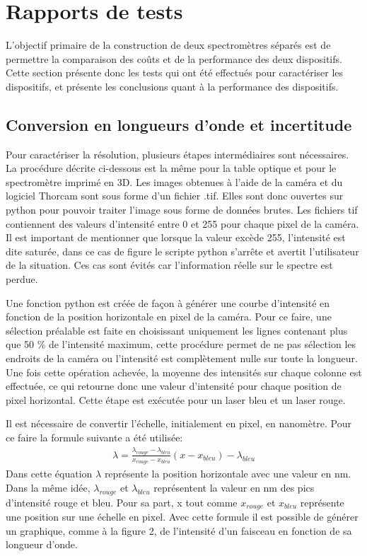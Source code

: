 \documentclass[11pt,letterpaper]{article}
\begin{document}
\section{Rapports de tests}

L'objectif primaire de la construction de deux spectromètres séparés est de permettre la 
comparaison des coûts et de la performance des deux dispositifs. Cette section présente
donc les tests qui ont été effectués pour caractériser les dispositifs, et présente les 
conclusions quant à la performance des dispositifs.

\subsection{Conversion en longueurs d'onde et incertitude}

Pour caractériser la résolution, plusieurs étapes intermédiaires sont nécessaires. La procédure décrite ci-dessous est la même 
pour la table optique et pour le spectromètre imprimé en 3D. 
Les images obtenues à l'aide de la caméra et du logiciel Thorcam sont sous forme d'un fichier .tif.
Elles sont donc ouvertes sur python pour pouvoir traiter l'image sous forme de données brutes. Les fichiers tif 
contiennent des valeurs d'intensité entre 0 et 255 pour chaque pixel de la caméra. Il est important de mentionner
que lorsque la valeur excède 255, l'intensité est dite saturée, dans ce cas de figure le scripte python s'arrête et 
avertit l'utilisateur de la situation. Ces cas sont évités car l'information réelle sur le spectre est perdue.

Une fonction python est créée de façon à générer une courbe d'intensité en fonction de la position horizontale 
en pixel de la caméra. Pour ce faire, une sélection préalable est faite en choisissant uniquement les lignes 
contenant plus que 50 \% de l'intensité maximum, cette procédure permet de ne pas sélection les endroits de la caméra 
ou l'intensité est complètement nulle sur toute la longueur. Une fois cette opération achevée, la moyenne des intensités sur chaque
colonne est effectuée, ce qui retourne donc une valeur d'intensité pour chaque position de pixel horizontal. Cette étape est exécutée pour 
un laser bleu et un laser rouge.

Il est nécessaire de convertir l'échelle, initialement en pixel, en nanomètre.
Pour ce faire la formule suivante a été utilisée: 
\begin{align}
  \lambda =\frac{\lambda _{rouge}-\lambda _{bleu}}{x_{rouge}-x_{bleu}}(x-x_{bleu})-\lambda _{bleu}
\end{align}
Dans cette équation $\lambda $ représente la position horizontale avec une valeur en nm. Dans la même idée, 
$\lambda _{rouge}$ et $\lambda _{bleu}$ représentent la valeur en nm des pics d'intensité rouge et bleu. 
Pour sa part, x tout comme $x_{rouge}$ et $x_{bleu}$ représente une position sur une échelle en pixel.
Avec cette formule il est possible de générer un graphique, comme à la figure 2, de l'intensité d'un faisceau en fonction 
de sa longueur d'onde. 
\end{document}
